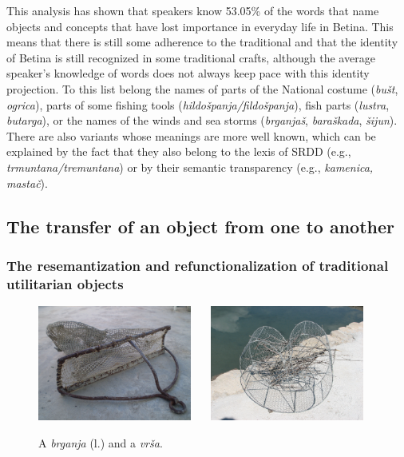 \documentclass[output=paper]{LSP/langsci}
\begin{document}
This analysis has shown that speakers know 53.05\% of the words that name objects and concepts that have lost importance in everyday life in Betina. This means that there is still some adherence to the traditional and that the identity of Betina is still recognized in some traditional crafts, although the average speaker’s knowledge of words does not always keep pace with this identity projection. To this list belong the names of parts of the National costume (\textit{bušt}, \textit{ogrica}), parts of some fishing tools (\textit{hildošpanja/fildošpanja}), fish parts (\textit{lustra}, \textit{butarga}), or the names of the winds and sea storms (\textit{brganjaš}, \textit{baraškada}, \textit{šijun}). There are also variants whose meanings are more well known, which can be explained by the fact that they also belong to the lexis of SRDD (e.g., \textit{trmuntana/tremuntana}) or by their semantic transparency (e.g., \textit{kamenica, mastač}). 

\subsection{The transfer of an object from one  to another}
\subsubsection{The resemantization and refunctionalization of traditional utilitarian objects}



\begin{figure}[b]
\includegraphics[width=0.45\textwidth]{illustrations/skevin_fig4_brganja}~~~
\includegraphics[width=0.45\textwidth]{illustrations/skevin_fig4_vrsa}
\label{fig4_brganja_vrsa}
\caption{A \textit{brganja} (l.) and a \textit{vrša}.}
\end{figure}
\end{document}

